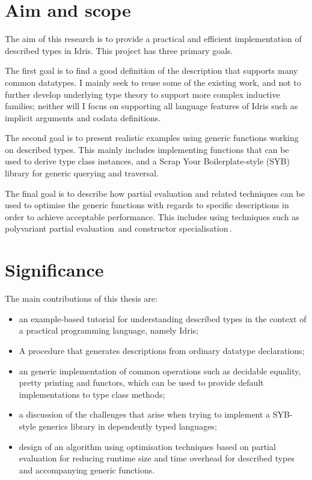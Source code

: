 \documentclass{ituthesis}
\theoremstyle{break}
\begin{document}
\section{Aim and scope}
\label{sec:AimandScope}
The aim of this research is to provide a practical and efficient implementation of described types in Idris.
This project has three primary goals.

The first goal is to find a good definition of the description that supports many common datatypes.
I mainly seek to reuse some of the existing work, and not to further develop underlying type theory to support more complex inductive families; neither will I focus on supporting all language features of Idris such as implicit arguments and codata definitions.

The second goal is to present realistic examples using generic functions working on described types. 
This mainly includes implementing functions that can be used to derive type class instances, and a Scrap Your Boilerplate-style (SYB) library for generic querying and traversal.

The final goal is to describe how partial evaluation and related techniques can be used to optimise the generic functions with regards to specific descriptions in order to achieve acceptable performance.
This includes using techniques such as polyvariant partial evaluation\,\autocite{Jones:1993:PEA:153676} and constructor specialisation\,\autocite{Mogensen:1993:CS:154630.154633}. %

\section{Significance}
\label{sec:Significance}
The main contributions of this thesis are:

\begin{itemize}
  \item an example-based tutorial for understanding described types in the context of a practical programming language, namely Idris;
    \item A procedure that generates descriptions from ordinary datatype declarations;
  \item an generic implementation of common operations such as decidable equality, pretty printing and functors, which can be used to provide default implementations to type class methods;
  \item a discussion of the challenges that arise when trying to implement a SYB-style generics library in dependently typed languages;
  \item design of an algorithm using optimisation techniques based on partial evaluation for reducing runtime size and time overhead for described types and accompanying generic functions.
\end{itemize}
\end{document}
